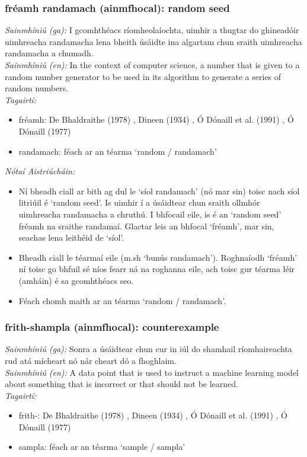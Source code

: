 \subsubsection*{fréamh randamach (ainmfhocal): random seed}
 \noindent \textit{Sainmhíniú (ga):} I gcomhthéacs ríomheolaíochta, uimhir a thugtar do ghineadóir uimhreacha randamacha lena bheith úsáidte ina algartam chun sraith uimhreacha randamacha a chumadh.
\\
 \noindent \textit{Sainmhíniú (en):} In the context of computer science, a number that is given to a random number generator to be used in its algorithm to generate a series of random numbers.
\\
 \noindent \textit{Tagairtí:}
\begin{itemize}
	\item fréamh: De Bhaldraithe (1978) \cite{de-bhaldraithe}, Dineen (1934) \cite{dineen}, Ó Dónaill et al. (1991) \cite{focloir-beag}, Ó Dónaill (1977) \cite{odonaill}
	\item randamach: féach ar an téarma `random / randamach'
\end{itemize}

 \noindent \textit{Nótaí Aistriúcháin:}
\begin{itemize}
	\item Ní bheadh ciall ar bith ag dul le `síol randamach' (nó mar sin) toisc nach síol litriúil é `random seed'. Is uimhir í a úsáidtear chun sraith ollmhór uimhreacha randamacha a chruthú. I bhfocail eile, is é an `random seed' fréamh na sraithe randamaí. Glactar leis an bhfocal `fréamh', mar sin, seachas lena leithéid de `síol'.
	\item Bheadh ciall le téarmaí eile (m.sh `bunús randamach'). Roghnaíodh `fréamh' ní toisc go bhfuil sé níos fearr ná na roghanna eile, ach toisc gur téarma léir (amháin) é sa gcomhthéacs seo.
	\item Féach chomh maith ar an téarma `random / randamach'.
\end{itemize}


\subsubsection*{frith-shampla (ainmfhocal): counterexample}
 \noindent \textit{Sainmhíniú (ga):} Sonra a úsáidtear chun cur in iúl do shamhail ríomhaireachta rud atá mícheart nó nár cheart dó a fhoghlaim.
\\
 \noindent \textit{Sainmhíniú (en):} A data point that is used to instruct a machine learning model about something that is incorrect or that should not be learned.
\\
 \noindent \textit{Tagairtí:}
\begin{itemize}
	\item frith-: De Bhaldraithe (1978) \cite{de-bhaldraithe}, Dineen (1934) \cite{dineen}, Ó Dónaill et al. (1991) \cite{focloir-beag}, Ó Dónaill (1977) \cite{odonaill}
	\item sampla: féach ar an téarma `sample / sampla'
\end{itemize}

